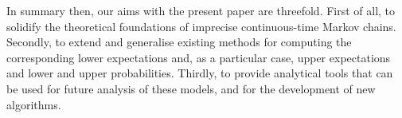 \documentclass[10pt,a4paper]{paper}
\theoremstyle{definition}
\begin{document}




In summary then, our aims with the present paper are threefold. First of all, to solidify the theoretical foundations of imprecise continuous-time Markov chains. Secondly, to extend and generalise existing methods for computing the corresponding lower expectations and, as a particular case, upper expectations and lower and upper probabilities. Thirdly, to provide analytical tools that can be used for future analysis of these models, and for the development of new algorithms.
\end{document}
